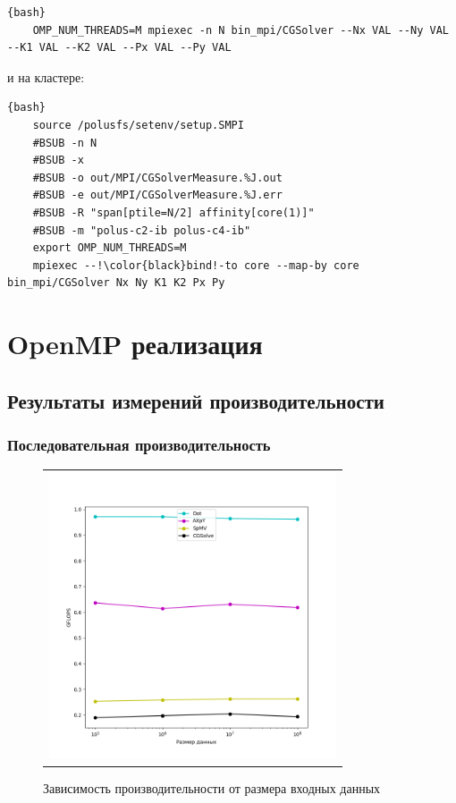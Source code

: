 \documentclass[12pt, a4paper]{article}
\begin{document}
\begin{lstlisting}{bash}
	OMP_NUM_THREADS=M mpiexec -n N bin_mpi/CGSolver --Nx VAL --Ny VAL --K1 VAL --K2 VAL --Px VAL --Py VAL
\end{lstlisting}

и на кластере:

\begin{lstlisting}[escapechar=!]{bash}
	source /polusfs/setenv/setup.SMPI
	#BSUB -n N
	#BSUB -x
	#BSUB -o out/MPI/CGSolverMeasure.%J.out
	#BSUB -e out/MPI/CGSolverMeasure.%J.err
	#BSUB -R "span[ptile=N/2] affinity[core(1)]"
	#BSUB -m "polus-c2-ib polus-c4-ib"
	export OMP_NUM_THREADS=M
	mpiexec --!\color{black}bind!-to core --map-by core bin_mpi/CGSolver Nx Ny K1 K2 Px Py
\end{lstlisting}

\newpage

\section{OpenMP реализация}


\subsection{Результаты измерений производительности}

\subsubsection{Последовательная производительность}

\begin{figure}[H]
	\center
	\begin{tabular}{c}
		\includegraphics[width=85mm]{singlethread_pc} \\
	\end{tabular}
	\caption{Зависимость производительности от размера входных данных} 
	\label{fig:singlethread_flops}
\end{figure}
\end{document}
